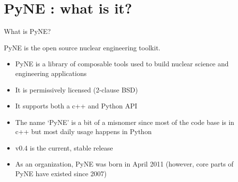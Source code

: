 \documentclass[xcolor=x11names,compress]{beamer}
\renewcommand{\(}{\begin{columns}}
\renewcommand{\)}{\end{columns}}
\newcommand{\<}[1]{\begin{column}{#1}}
\renewcommand{\>}{\end{column}}
\begin{document}
\section{PyNE \cite{pyne}: what is it?}
\begin{frame}{What is PyNE?}

    PyNE is \textcolor{dgreen}{the} open source nuclear engineering toolkit.
    \vspace*{1em}
    \begin{itemize}
      \item PyNE is a \alert{library of composable tools} used to build
      nuclear science and engineering applications
      \item It is \alert{permissively licensed} (2-clause BSD)
      \item It supports both a \alert{c++} and \alert{Python} API
      \item The name `PyNE' is a bit of a misnomer since most of the code
      base is in c++ but most daily usage happens in Python
      \item \alert{v0.4} is the current, stable release
      \item As an organization, PyNE was born in April 2011
      (however, core parts of PyNE have existed since 2007)
    \end{itemize}

\end{frame}
\end{document}
